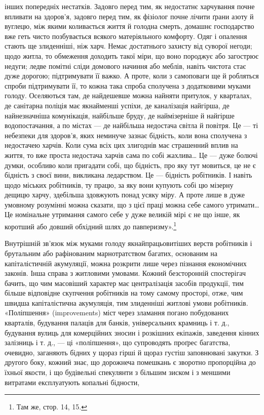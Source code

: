 \parcont{}  %
інших попередніх нестатків. Задовго перед тим, як недостатнє
харчування почне впливати на здоров’я, задовго перед тим, як
фізіолог почне лічити ґрани азоту й вуглецю, між якими коливається
життя й голодна смерть, домашнє господарство вже геть
чисто позбувається всякого матеріяльного комфорту. Одяг і
опалення стають ще злиденніші, ніж харч. Немає достатнього
захисту від суворої негоди; щодо житла, то обмеження доходить
такої міри, що воно породжує або загострює недуги; ледве помітні
сліди домового начиння або меблів, навіть чистота стає
дуже дорогою; підтримувати її важко. А проте, коли з самоповаги
ще й робляться спроби підтримувати її, то кожна така спроба
сполучена з додатковими муками голоду. Оселяються там, де
найдешевше можна найняти притулок, у кварталах, де санітарна
поліція має якнайменші успіхи, де каналізація найгірша, де
найнезначніша комунікація, найбільше бруду, де наймізерніше
й найгірше водопостачання, а по містах — де найбільша недостача
світла й повітря. Це — ті небезпеки для здоров’я, яких
неминуче зазнає бідність, коли вона сполучена з недостачею харчів.
Коли сума всіх цих злигоднів має страшенний вплив на
життя, то вже проста недостача харчів сама по собі жахлива\dots{}
Це — дуже болючі думки, особливо коли пригадати собі, що
бідність, про яку тут мовиться, це не є бідність з своєї вини,
викликана ледарством. Це — бідність робітників. І навіть щодо
міських робітників, ту працю, за яку вони купують собі цю мізерну
дещицю харчу, здебільша здовжують понад усяку міру.
А проте лише в дуже умовному розумінні можна сказати, що
з цієї праці можна себе самого утримати\dots{} Це номінальне утримання
самого себе у дуже великій мірі є не що інше, як коротший
або довший обхідний шлях до павперизму».\footnote{
Там же, стор. 14, 15.
}

Внутрішній зв’язок між муками голоду якнайпрацьовитіших
верств робітників і брутальним або рафінованим марнотратством
багатих, основаним на капіталістичній акумуляції, можна
розкрити лише через пізнання економічних законів. Інша справа
з житловими умовами. Кожний безсторонній спостерігач бачить,
що чим масовіший характер має централізація засобів продукції,
тим більше відповідне скупчення робітників на тому самому
просторі, отже, чим швидша капіталістична акумуляція, тим
злиденніші житлові умови робітників. «Поліпшення» (improvements)
міст через зламання погано побудованих кварталів,
будування палаців для банків, універсальних крамниць і т. д.,
будування вулиць для комерційних зносин і розкішних екіпажів,
заведення кінних залізниць і т. д., — ці «поліпшення»,
що супроводять проґрес багатства, очевидно, заганяють бідних
у щораз гірші й щораз густіш заповнювані закутки. З другого
боку, кожний знає, що дорожнеча помешкань є зворотно пропорційна
до їхньої якости, і що будівельні спекулянти з більшим
зиском і з меншими витратами експлуатують копальні бідности,
\parbreak{}  %
